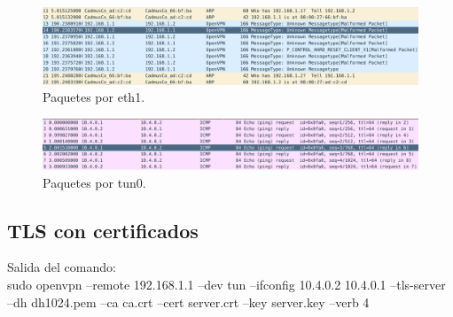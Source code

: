 \documentclass[11pt]{article}
\begin{document}
      \begin{figure}[H]
        \centering
        \includegraphics[width = \textwidth]{pingeth1}
        \caption{Paquetes por eth1.}
        \label{figure:pingeth1}
      \end{figure}

      \begin{figure}[H]
        \centering
        \includegraphics[width = \textwidth]{pingtun0}
        \caption{Paquetes por tun0.}
        \label{figure:pingtun0}
      \end{figure}

    \subsection{TLS con certificados}
    \par
    Salida del comando:\\
    sudo openvpn --remote 192.168.1.1 --dev tun --ifconfig 10.4.0.2 10.4.0.1 --tls-server --dh dh1024.pem --ca ca.crt --cert server.crt --key server.key --verb 4
\end{document}

